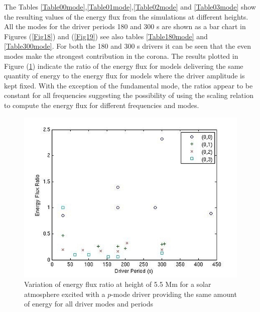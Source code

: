 \documentclass[preprint,authoryear,12pt]{elsarticle}
\begin{document}
The Tables \ref{Table00mode},\ref{Table01mode},\ref{Table02mode} and \ref{Table03mode} show the resulting values of the energy flux from the simulations at different heights. All the modes for the driver periods 180 and 300 s are shown as a bar chart in Figures (\ref{Fig18}) and (\ref{Fig19}) see also tables \ref{Table180mode} and \ref{Table300mode}. For both the 180 and 300 s drivers it can be seen that the even modes make the strongest contribution in the corona. The results plotted in Figure (\ref{Fig20}) indicate the ratio of the energy flux for models delivering the same quantity of energy to the energy flux for models where the driver amplitude is kept fixed. With the exception of the fundamental mode, the ratios appear to be constant for all frequencies suggesting the possibility of using the scaling relation to compute the energy flux for different frequencies and modes.  
\begin{figure}[h]
\includegraphics[scale=3]{imrescale/ratio_varoverconst_eflux_vperiod_for_modes_5p5Mm.jpg}
\caption{Variation of energy flux ratio at height of 5.5 Mm for a solar atmosphere excited with a $p$-mode driver providing the same amount of energy for all driver modes and periods}
\label{Fig20}
\end{figure}
\end{document}
